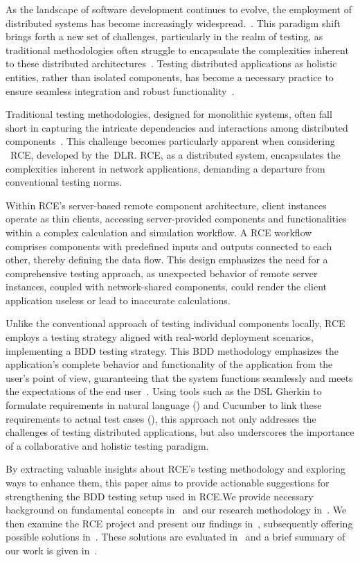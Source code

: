 As the landscape of software development continues to evolve, the employment of distributed systems has become increasingly widespread.~\cite{Xingang2018,Feldman1978}. This paradigm shift brings forth a new set of challenges, particularly in the realm of testing, as traditional methodologies often struggle to encapsulate the complexities inherent to these distributed architectures~\cite{Liu,Lima2017}. Testing distributed applications as holistic entities, rather than isolated components, has become a necessary practice to ensure seamless integration and robust functionality~\cite{Liu,Lima2017}.

Traditional testing methodologies, designed for monolithic systems, often fall short in capturing the intricate dependencies and interactions among distributed components~\cite{Liu,Lima2017}. This challenge becomes particularly apparent when considering ~\acf{RCE}, developed by the~\acf{DLR}. \ac{RCE}, as a distributed system, encapsulates the complexities inherent in network applications, demanding a departure from conventional testing norms.

Within \ac{RCE}'s server-based remote component architecture, client instances operate as thin clients, accessing server-provided components and functionalities within a complex calculation and simulation workflow. A \ac{RCE} workflow comprises components with predefined inputs and outputs connected to each other, thereby defining the data flow. This design emphasizes the need for a comprehensive testing approach, as unexpected behavior of remote server instances, coupled with network-shared components, could render the client application useless or lead to inaccurate calculations.

Unlike the conventional approach of testing individual components locally, \ac{RCE} employs a testing strategy aligned with real-world deployment scenarios, implementing a \ac{BDD} testing strategy. This \ac{BDD} methodology emphasizes the application's complete behavior and functionality of the application from the user's point of view, guaranteeing that the system functions seamlessly and meets the expectations of the end user~\cite{wynne2012cucumber}. Using tools such as the \ac{DSL} Gherkin to formulate requirements in natural language () and Cucumber to link these requirements to actual test cases (), this approach not only addresses the challenges of testing distributed applications, but also underscores the importance of a collaborative and holistic testing paradigm.

By extracting valuable insights about \ac{RCE}'s testing methodology and exploring ways to enhance them, this paper aims to provide actionable suggestions for strengthening the \ac{BDD} testing setup used in \ac{RCE}.We provide necessary background on fundamental concepts in~ and our research methodology in~. We then examine the \ac{RCE} project and present our findings in~, subsequently offering possible solutions in~. These solutions are evaluated in~ and a brief summary of our work is given in~.